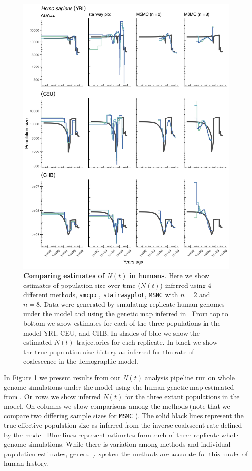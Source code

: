 \documentclass[12pt,halfline,a4paper]{ouparticle}
\newcommand{\MSMC}{\texttt{MSMC} }
\newcommand{\smcpp}{\texttt{smcpp} }
\begin{document}
\begin{figure}
\begin{center}
\includegraphics[width=0.8\linewidth]{display_items/homo_sapiens_mask_Ragsdale.png}
\caption{\textbf{Comparing estimates of $N(t)$ in humans}. Here we show estimates of population
size over time ($N(t)$) inferred using 4 different methods, \smcpp, \texttt{stairwayplot},
\MSMC with $n=2$ and $n=8$. Data were generated by simulating
replicate human genomes under the \cite{ragsdale2019models} model and using the genetic map
inferred in \cite{international2007second}. From top to bottom we show estimates for each
of the three populations in the model YRI, CEU, and CHB. In shades of blue we show the estimated
$N(t)$ trajectories for each replicate. In black we show the true population size history as inferred
for the rate of coalescence in the demographic model.}
\label{fig:n_t_ragsdale}
\end{center}
\end{figure}


In Figure \ref{fig:n_t_ragsdale} we present results from our $N(t)$ analysis pipeline
run on whole genome simulations under the \cite{ragsdale2019models} model using the
human genetic map estimated from \cite{international2007second}. On rows
we show inferred $N(t)$ for the three extant populations in the model.
On columns we show comparisons among the methods (note that we compare two differing
sample sizes for \MSMC). The solid black lines represent the true effective population
size as inferred from the inverse coalescent rate defined by the model.
Blue lines represent estimates from each of three replicate whole genome simulations.
While there is variation among methods and individual population estimates,
generally spoken the methods are accurate for this model of human history.
\end{document}
